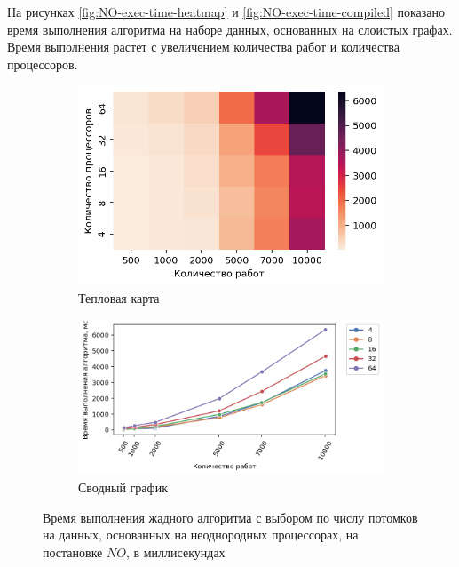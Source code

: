 На рисунках \ref{fig:NO-exec-time-heatmap} и \ref{fig:NO-exec-time-compiled} показано время выполнения алгоритма на наборе данных, основанных на слоистых графах. Время выполнения растет с увеличением количества работ и количества процессоров.

\begin{figure}[!htbp]
    \centering
    \begin{subfigure}{0.49\textwidth}
        \includegraphics[width=\textwidth]{imgs/unbalanced/NO/et_heatmap.png}
        \caption{Тепловая карта}
        \label{fig:NO-unbalanced-exec-time-heatmap}
    \end{subfigure}
    \hfill
    \begin{subfigure}{0.49\textwidth}
        \includegraphics[width=\textwidth]{imgs/unbalanced/NO/tr_graph.png}
        \caption{Сводный график}
        \label{fig:NO-unbalanced-exec-time-compiled}
    \end{subfigure}
    \caption{Время выполнения жадного алгоритма с выбором по числу потомков на данных, основанных на неоднородных процессорах, на постановке $NO$, в миллисекундах}
\end{figure}

